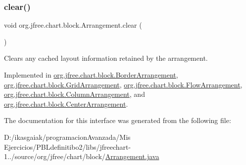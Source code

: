 \mbox{\label{interfaceorg_1_1jfree_1_1chart_1_1block_1_1_arrangement_a4db8248d65d1c074b7cf5ecc35d0f097}} 
\subsubsection{\texorpdfstring{clear()}{clear()}}
{\footnotesize\ttfamily void org.\+jfree.\+chart.\+block.\+Arrangement.\+clear (\begin{DoxyParamCaption}{ }\end{DoxyParamCaption})}

Clears any cached layout information retained by the arrangement. 

Implemented in \mbox{\hyperlink{classorg_1_1jfree_1_1chart_1_1block_1_1_border_arrangement_a7ac866d41b0692c7f53bb86423fb9973}{org.\+jfree.\+chart.\+block.\+Border\+Arrangement}}, \mbox{\hyperlink{classorg_1_1jfree_1_1chart_1_1block_1_1_grid_arrangement_a4816d3d71a8538bb4206f57b39d88f3e}{org.\+jfree.\+chart.\+block.\+Grid\+Arrangement}}, \mbox{\hyperlink{classorg_1_1jfree_1_1chart_1_1block_1_1_flow_arrangement_a331e5fa3d4450da11973ab1e377b9b05}{org.\+jfree.\+chart.\+block.\+Flow\+Arrangement}}, \mbox{\hyperlink{classorg_1_1jfree_1_1chart_1_1block_1_1_column_arrangement_a5da939ad032092f20b3ed15922d171e3}{org.\+jfree.\+chart.\+block.\+Column\+Arrangement}}, and \mbox{\hyperlink{classorg_1_1jfree_1_1chart_1_1block_1_1_center_arrangement_a2fdce4f7fc36bc3d059bcbf8f1866eb2}{org.\+jfree.\+chart.\+block.\+Center\+Arrangement}}.



The documentation for this interface was generated from the following file\+:\begin{DoxyCompactItemize}
\item 
D\+:/ikasgaiak/programacion\+Avanzada/\+Mis Ejercicios/\+P\+B\+Ldefinitibo2/libs/jfreechart-\/1../source/org/jfree/chart/block/\mbox{\hyperlink{_arrangement_8java}{Arrangement.\+java}}\end{DoxyCompactItemize}
